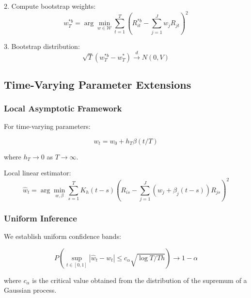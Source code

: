 2. Compute bootstrap weights:
\begin{equation}
    w_T^{*b} = \arg\min_{w \in \mathcal{W}} \sum_{t=1}^T (R_{it}^{*b} - \sum_{j=1}^J w_jR_{jt})^2
\end{equation}

3. Bootstrap distribution:
\begin{equation}
    \sqrt{T}(w_T^{*b} - w_T^*) \xrightarrow{d} N(0, V)
\end{equation}

\subsection{Time-Varying Parameter Extensions}

\subsubsection{Local Asymptotic Framework}

For time-varying parameters:

\begin{equation}
    w_t = w_0 + h_T\beta(t/T)
\end{equation}

where $h_T \to 0$ as $T \to \infty$.

Local linear estimator:
\begin{equation}
    \hat{w}_t = \arg\min_{w,\beta} \sum_{s=1}^T K_h(t-s)(R_{is} - \sum_{j=1}^J (w_j + \beta_j(t-s))R_{js})^2
\end{equation}

\subsubsection{Uniform Inference}

We establish uniform confidence bands:

\begin{equation}
    P(\sup_{t \in [0,1]} |\hat{w}_t - w_t| \leq c_{\alpha}\sqrt{\log T/Th}) \to 1-\alpha
\end{equation}

where $c_{\alpha}$ is the critical value obtained from the distribution of the supremum of a Gaussian process.


